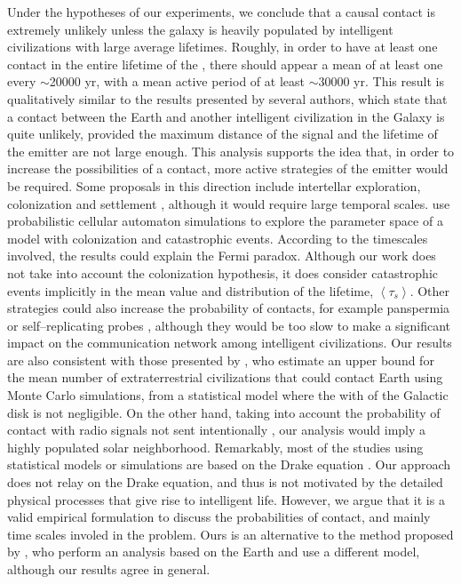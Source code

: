 \documentclass[crop]{CSLB}
\begin{document}
Under the hypotheses of our experiments, we conclude that a causal
contact is extremely unlikely unless the galaxy is heavily populated
by intelligent civilizations with large average lifetimes.
%
Roughly, in order to have at least one contact in the entire lifetime
of the \ceti{}, there should appear a mean of at least one \ceti{}
every $\sim$20000 yr, with a mean active period of at least
$\sim$30000 yr.
%
This result is qualitatively similar to the results presented by
several authors, which state that a contact between the Earth and
another intelligent civilization in the Galaxy is quite unlikely,
provided the maximum distance of the signal and the lifetime of the
emitter are not large enough.
%
This analysis supports the idea that, in order to increase the
possibilities of a contact, more active strategies of the emitter
would be required.
%
Some proposals in this direction include intertellar exploration,
colonization and settlement \citep{brin_great_1983, Dosovic2019,
galera_invasion_2019}, although it would require large temporal
scales.
%
\citet{Dosovic2019} use probabilistic cellular automaton simulations
to explore the parameter space of a model with colonization and
catastrophic events.
%
According to the timescales involved, the results could explain the
Fermi paradox.
%
Although our work does not take into account the colonization
hypothesis, it does consider catastrophic events implicitly in the
mean value and distribution of the lifetime, $\left<\tau_s\right>$.
%
Other strategies could also increase the probability of contacts, for
example panspermia \citep[e.g.,][]{starling_virulence_2013} or
self--replicating probes \citep[e.g.,][]{barlow_galactic_2013},
although they would be too slow to make a significant impact on the
communication network among intelligent civilizations.
%
Our results are also consistent with those presented by
\citet{grimaldi_signal_2017}, who estimate an upper bound for the mean
number of extraterrestrial civilizations that could contact Earth
using Monte Carlo simulations, from a statistical model where the with
of the Galactic disk is not negligible.
%
On the other hand, taking into account the probability of contact with
radio signals not sent intentionally \citep{horvat_calculating_2007},
our analysis would imply a highly populated solar neighborhood.
%
Remarkably, most of the studies using statistical models or
simulations are based on the Drake equation
\citep{cirkovic_temporal_2004, smith_broadcasting_2009,
bloetscher_using_2019}.
%
Our approach does not relay on the Drake equation, and thus is not
motivated by the detailed physical processes that give rise to
intelligent life.
%
However, we argue that it is a valid empirical formulation to discuss
the probabilities of contact, and mainly time scales involed in the
problem.
%
Ours is an alternative to the method proposed by
\citet{balbi_impact_2018}, who perform an analysis based on the Earth
and use a different model, although our results agree in general.
\end{document}
